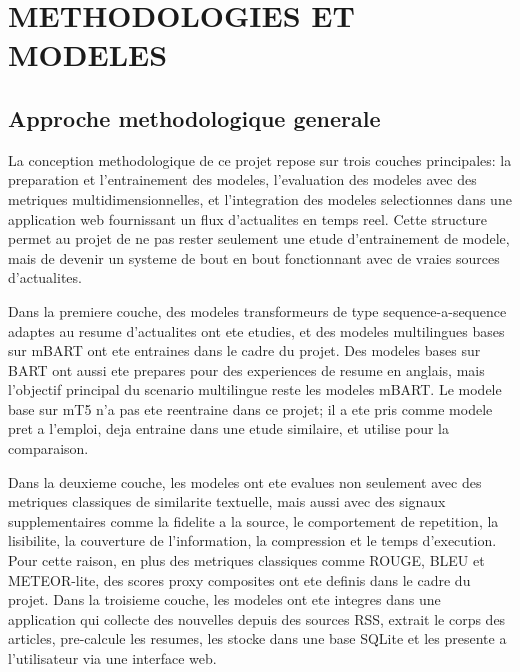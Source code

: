 \chapter{METHODOLOGIES ET MODELES}
\thispagestyle{empty}
\label{chap:methodologies-modeles-fr}



\section{Approche methodologique generale}

La conception methodologique de ce projet repose sur trois couches principales: la preparation et l'entrainement des modeles, l'evaluation des modeles avec des metriques multidimensionnelles, et l'integration des modeles selectionnes dans une application web fournissant un flux d'actualites en temps reel. Cette structure permet au projet de ne pas rester seulement une etude d'entrainement de modele, mais de devenir un systeme de bout en bout fonctionnant avec de vraies sources d'actualites.

Dans la premiere couche, des modeles transformeurs de type sequence-a-sequence adaptes au resume d'actualites ont ete etudies, et des modeles multilingues bases sur mBART ont ete entraines dans le cadre du projet. Des modeles bases sur BART ont aussi ete prepares pour des experiences de resume en anglais, mais l'objectif principal du scenario multilingue reste les modeles mBART. Le modele base sur mT5 n'a pas ete reentraine dans ce projet; il a ete pris comme modele pret a l'emploi, deja entraine dans une etude similaire, et utilise pour la comparaison.

Dans la deuxieme couche, les modeles ont ete evalues non seulement avec des metriques classiques de similarite textuelle, mais aussi avec des signaux supplementaires comme la fidelite a la source, le comportement de repetition, la lisibilite, la couverture de l'information, la compression et le temps d'execution. Pour cette raison, en plus des metriques classiques comme ROUGE, BLEU et METEOR-lite, des scores proxy composites ont ete definis dans le cadre du projet. Dans la troisieme couche, les modeles ont ete integres dans une application qui collecte des nouvelles depuis des sources RSS, extrait le corps des articles, pre-calcule les resumes, les stocke dans une base SQLite et les presente a l'utilisateur via une interface web.

